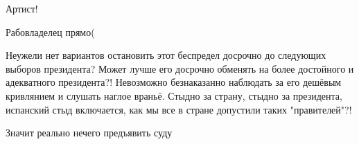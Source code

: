 \begin{itemize}
Артист!

Рабовладелец прямо(


Неужели нет вариантов остановить этот беспредел досрочно до следующих выборов
президента? Может лучше его досрочно обменять на более достойного и адекватного
президента?! Невозможно безнаказанно наблюдать за его дешёвым кривлянием и
слушать наглое враньё. Стыдно за страну, стыдно за президента, испанский стыд
включается, как мы все в стране допустили таких "правителей"?!

Значит реально нечего предъявить суду

\end{itemize} %
